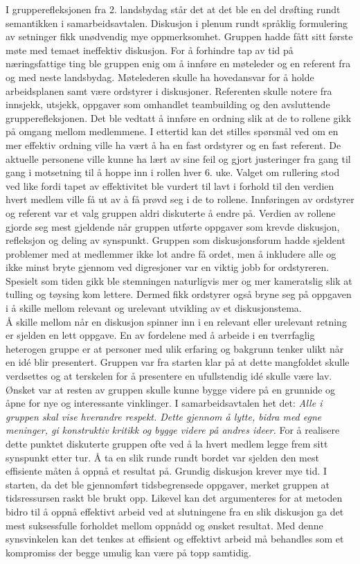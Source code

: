 I grupperefleksjonen fra 2. landsbydag står det at det ble en del drøfting rundt semantikken i samarbeidsavtalen. 
Diskusjon i plenum rundt språklig formulering av setninger fikk unødvendig mye oppmerksomhet.
Gruppen hadde fått sitt første møte med temaet ineffektiv diskusjon.
For å forhindre tap av tid på næringsfattige ting ble gruppen enig om å innføre en møteleder og en referent fra og med neste landsbydag.
Møtelederen skulle ha hovedansvar for å holde arbeidsplanen samt være ordstyrer i diskusjoner.
Referenten skulle notere fra innsjekk, utsjekk, oppgaver som omhandlet teambuilding og den avsluttende grupperefleksjonen.
Det ble vedtatt å innføre en ordning slik at de to rollene gikk på omgang mellom medlemmene.
I ettertid kan det stilles spørsmål ved om en mer effektiv ordning ville ha vært å ha en fast ordstyrer og en fast referent.
De aktuelle personene ville kunne ha lært av sine feil og gjort justeringer fra gang til gang i motsetning til å hoppe inn i rollen hver 6. uke.
Valget om rullering stod ved like fordi tapet av effektivitet ble vurdert til lavt i forhold til den verdien hvert medlem ville få ut av å få prøvd seg i de to rollene.
Innføringen av ordstyrer og referent var et valg gruppen aldri diskuterte å endre på. 
Verdien av rollene gjorde seg mest gjeldende når gruppen utførte oppgaver som krevde diskusjon, refleksjon og deling av synspunkt.
Gruppen som diskusjonsforum hadde sjeldent problemer med at medlemmer ikke lot andre få ordet, men å inkludere alle og ikke minst bryte gjennom ved digresjoner var en viktig jobb for ordstyreren. 
Spesielt som tiden gikk ble stemningen naturligvis mer og mer kameratslig slik at tulling og tøysing kom lettere.
Dermed fikk ordstyrer også bryne seg på oppgaven i å skille mellom relevant og urelevant utvikling av et diskusjonstema.\\

Å skille mellom når en diskusjon spinner inn i en relevant eller urelevant retning er sjelden en lett oppgave.
En av fordelene med å arbeide i en tverrfaglig heterogen gruppe er at personer med ulik erfaring og bakgrunn tenker ulikt når en id\'{e} blir presentert.
Gruppen var fra starten klar på at dette mangfoldet skulle verdsettes og at terskelen for å presentere en ufullstendig id\'{e} skulle være lav.
Ønsket var at resten av gruppen skulle kunne bygge videre på en grunnide og åpne for nye og interessante vinklinger. 
I samarbeidsavtalen het det: \textit{Alle i gruppen skal vise hverandre respekt. Dette gjennom å lytte, bidra med egne meninger, gi konstruktiv kritikk og bygge videre på andres ideer.}
For å realisere dette punktet diskuterte gruppen ofte ved å la hvert medlem legge frem sitt synspunkt etter tur.
Å ta en slik runde rundt bordet var sjelden den mest effisiente måten å oppnå et resultat på.
Grundig diskusjon krever mye tid. 
I starten, da det ble gjennomført tidsbegrensede oppgaver, merket gruppen at tidsressursen raskt ble brukt opp.
Likevel kan det argumenteres for at metoden bidro til å oppnå effektivt arbeid ved at slutningene fra en slik diskusjon ga det mest suksessfulle forholdet mellom oppnådd og ønsket resultat.
Med denne synsvinkelen kan det tenkes at effisient og effektivt arbeid må behandles som et kompromiss der begge umulig kan være på topp samtidig.\\


